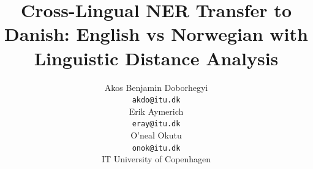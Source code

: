 \documentclass[11pt]{article}
\title{Cross-Lingual NER Transfer to Danish: English vs Norwegian with Linguistic Distance Analysis}
\author{Akos Benjamin Doborhegyi \\
\texttt{akdo@itu.dk} \\
Erik Aymerich \\
\texttt{eray@itu.dk} \\
O'neal Okutu \\
\texttt{onok@itu.dk} \\
IT University of Copenhagen}
\date{}
\begin{document}
\maketitle
{}
\pagestyle{plain}










\begin{sloppypar}

\end{sloppypar}

\appendix

\end{document}
